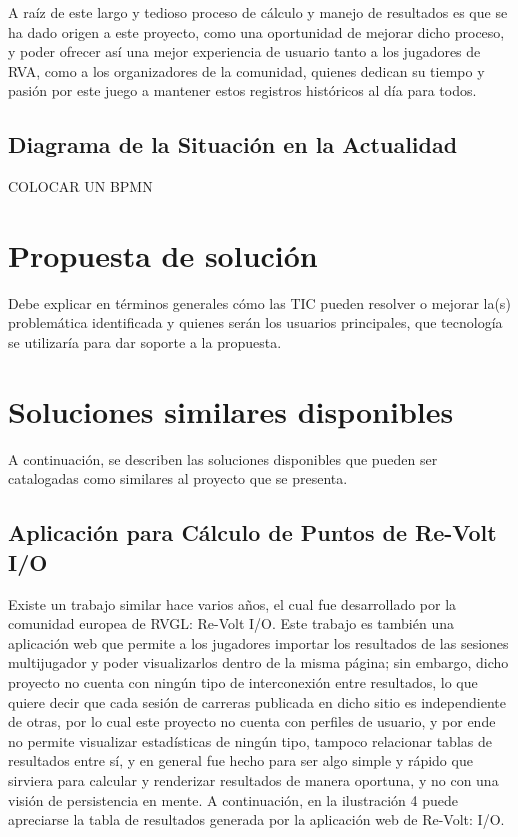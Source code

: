 A raíz de este largo y tedioso proceso de cálculo y manejo de resultados es que se ha dado origen a este proyecto, como una oportunidad de mejorar dicho proceso, y poder ofrecer así una mejor experiencia de usuario tanto a los jugadores de RVA, como a los organizadores de la comunidad, quienes dedican su tiempo y pasión por este juego a mantener estos registros históricos al día para todos.

\subsection{Diagrama de la Situación en la Actualidad}
COLOCAR UN BPMN

\section{Propuesta de solución}
Debe explicar en términos generales cómo las TIC pueden resolver o mejorar la(s) problemática identificada y quienes serán los usuarios principales, que tecnología se utilizaría para dar soporte a la propuesta.

\section{Soluciones similares disponibles}
A continuación, se describen las soluciones disponibles que pueden ser catalogadas como similares al proyecto que se presenta.

\subsection{Aplicación para Cálculo de Puntos de Re-Volt I/O}
Existe un trabajo similar hace varios años, el cual fue desarrollado por la comunidad europea de RVGL: Re-Volt I/O. Este trabajo es también una aplicación web que permite a los jugadores importar los resultados de las sesiones multijugador y poder visualizarlos dentro de la misma página; sin embargo, dicho proyecto no cuenta con ningún tipo de interconexión entre resultados, lo que quiere decir que cada sesión de carreras publicada en dicho sitio es independiente de otras, por lo cual este proyecto no cuenta con perfiles de usuario, y por ende no permite visualizar estadísticas de ningún tipo, tampoco relacionar tablas de resultados entre sí, y en general fue hecho para ser algo simple y rápido que sirviera para calcular y renderizar resultados de manera oportuna, y no con una visión de persistencia en mente. A continuación, en la ilustración 4 puede apreciarse la tabla de resultados generada por la aplicación web de Re-Volt: I/O.

